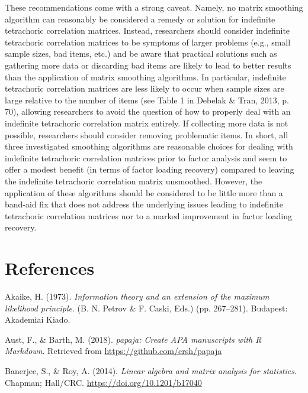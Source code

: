 \documentclass[
  english,
  man]{apa6}
\begin{document}
These recommendations come with a strong caveat. Namely, no matrix smoothing algorithm can reasonably be considered a remedy or solution for indefinite tetrachoric correlation matrices. Instead, researchers should consider indefinite tetrachoric correlation matrices to be symptoms of larger problems (e.g., small sample sizes, bad items, etc.) and be aware that practical solutions such as gathering more data or discarding bad items are likely to lead to better results than the application of matrix smoothing algorithms. In particular, indefinite tetrachoric correlation matrices are less likely to occur when sample sizes are large relative to the number of items (see Table 1 in Debelak \& Tran, 2013, p. 70), allowing researchers to avoid the question of how to properly deal with an indefinite tetrachoric correlation matrix entirely. If collecting more data is not possible, researchers should consider removing problematic items. In short, all three investigated smoothing algorithms are reasonable choices for dealing with indefinite tetrachoric correlation matrices prior to factor analysis and seem to offer a modest benefit (in terms of factor loading recovery) compared to leaving the indefinite tetrachoric correlation matrix unsmoothed. However, the application of these algorithms should be considered to be little more than a band-aid fix that does not address the underlying issues leading to indefinite tetrachoric correlation matrices nor to a marked improvement in factor loading recovery.

\newpage

\hypertarget{references}{%
\section{References}\label{references}}

\begingroup
\setlength{\parindent}{-0.5in}
\setlength{\leftskip}{0.5in}

\hypertarget{refs}{}
\leavevmode\hypertarget{ref-akaike1973}{}%
Akaike, H. (1973). \emph{Information theory and an extension of the maximum likelihood principle}. (B. N. Petrov \& F. Caski, Eds.) (pp. 267--281). Budapest: Akademiai Kiado.

\leavevmode\hypertarget{ref-R-papaja}{}%
Aust, F., \& Barth, M. (2018). \emph{papaja: Create APA manuscripts with R Markdown}. Retrieved from \url{https://github.com/crsh/papaja}

\leavevmode\hypertarget{ref-banerjee2014}{}%
Banerjee, S., \& Roy, A. (2014). \emph{Linear algebra and matrix analysis for statistics}. Chapman; Hall/CRC. \url{https://doi.org/10.1201/b17040}
\end{document}
